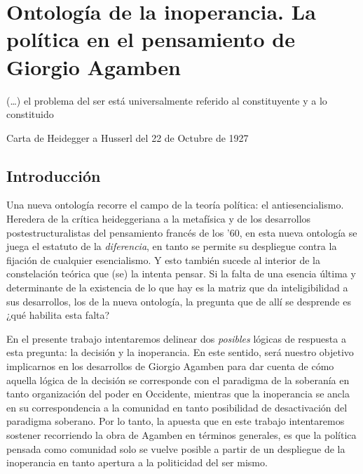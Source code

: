 \chapter{Ontología de la inoperancia. La política en el pensamiento de Giorgio Agamben}

(\dots) el problema del ser está universalmente referido al
constituyente y a lo constituido

Carta de Heidegger a Husserl del 22 de Octubre de 1927

\section{Introducción}

Una nueva ontología recorre el campo de la teoría política: el
antiesencialismo. Heredera de la crítica heideggeriana a la metafísica y
de los desarrollos postestructuralistas del pensamiento francés de los
'60, en esta nueva ontología se juega el estatuto de la
\emph{diferencia}, en tanto se permite su despliegue contra la fijación
de cualquier esencialismo. Y esto también sucede al interior de la
constelación teórica que (se) la intenta pensar. Si la falta de una
esencia última y determinante de la existencia de lo que hay es la
matriz que da inteligibilidad a sus desarrollos, los de la nueva
ontología, la pregunta que de allí se desprende es ¿qué habilita esta
falta?

En el presente trabajo intentaremos delinear dos \emph{posibles} lógicas
de respuesta a esta pregunta: la decisión y la inoperancia. En este
sentido, será nuestro objetivo implicarnos en los desarrollos de Giorgio
Agamben para dar cuenta de cómo aquella lógica de la decisión se
corresponde con el paradigma de la soberanía en tanto organización del
poder en Occidente, mientras que la inoperancia se ancla en su
correspondencia a la comunidad en tanto posibilidad de desactivación del
paradigma soberano. Por lo tanto, la apuesta que en este trabajo
intentaremos sostener recorriendo la obra de Agamben en términos
generales, es que la política pensada como comunidad solo se vuelve
posible a partir de un despliegue de la inoperancia en tanto apertura a
la politicidad del ser mismo.

